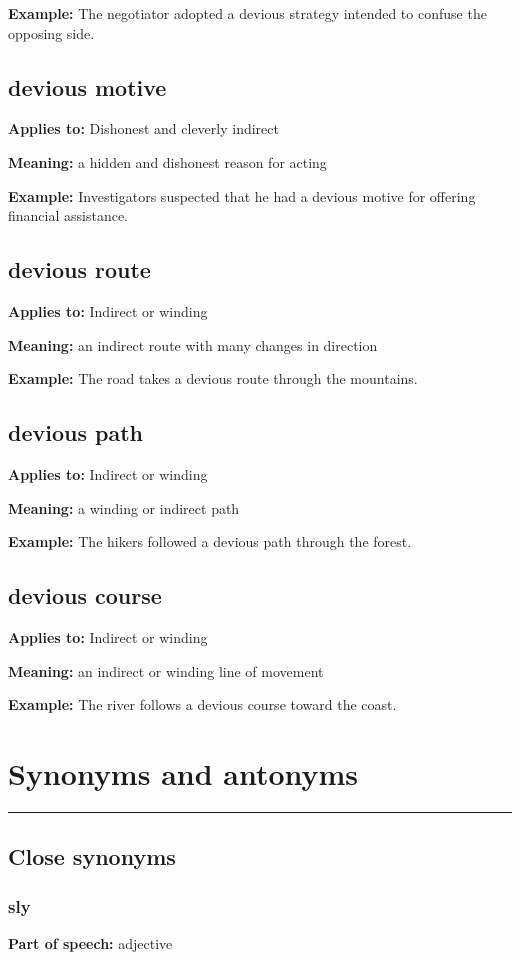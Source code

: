 \documentclass[11pt]{article}
\newcommand{\sectionrule}{\par\vspace{-0.5em}\noindent\textcolor{Accent}{\rule{\linewidth}{0.6pt}}\par}
\begin{document}
\textbf{Example:} The negotiator adopted a devious strategy intended to confuse the opposing side.

\subsection{devious motive}
\textbf{Applies to:} Dishonest and cleverly indirect

\textbf{Meaning:} a hidden and dishonest reason for acting

\textbf{Example:} Investigators suspected that he had a devious motive for offering financial assistance.

\subsection{devious route}
\textbf{Applies to:} Indirect or winding

\textbf{Meaning:} an indirect route with many changes in direction

\textbf{Example:} The road takes a devious route through the mountains.

\subsection{devious path}
\textbf{Applies to:} Indirect or winding

\textbf{Meaning:} a winding or indirect path

\textbf{Example:} The hikers followed a devious path through the forest.

\subsection{devious course}
\textbf{Applies to:} Indirect or winding

\textbf{Meaning:} an indirect or winding line of movement

\textbf{Example:} The river follows a devious course toward the coast.

\section{Synonyms and antonyms}
\sectionrule
\subsection{Close synonyms}
\subsubsection{sly}
\textbf{Part of speech:} adjective
\end{document}

